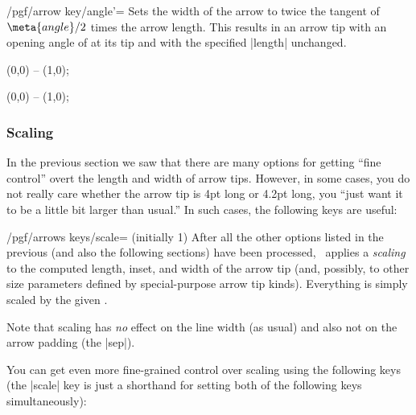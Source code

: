 \begin{key}{/pgf/arrow key/angle'=}
  Sets the width of the arrow to twice the tangent of $\meta{angle}/2$
  times the arrow length. This results in an arrow tip with an opening
  angle of  at its tip and with the specified |length|
  unchanged. 
\begin{codeexample}[]
\tikz \draw [arrows = {-Stealth[inset=0pt, length=10pt, angle'=90]}]
            (0,0) -- (1,0);
\end{codeexample}
\begin{codeexample}[]
\tikz \draw [arrows = {-Stealth[inset=0pt, length=10pt, angle'=30]}]
            (0,0) -- (1,0);
\end{codeexample}
\end{key}


\subsubsection{Scaling}

In the previous section we saw that there are many options for getting
``fine control'' overt the length and width of arrow tips. However, in
some cases, you do not really care whether the arrow tip is 4pt long
or 4.2pt long, you ``just want it to be a little bit larger than
usual.'' In such cases, the following keys are useful:

\begin{key}{/pgf/arrows keys/scale= (initially 1)}
  After all the other options listed in the previous (and also the
  following sections) have been processed, \tikzname\ applies a
  \emph{scaling} to the computed length, inset, and width of the arrow
  tip (and, possibly, to other size parameters defined by
  special-purpose arrow tip kinds). Everything is simply scaled by the
  given .
\begin{codeexample}[]
\end{codeexample}  
  Note that scaling has \emph{no} effect on the line width (as usual)
  and also not on the arrow padding (the |sep|).
\end{key}

You can get even more fine-grained control over scaling using the
following keys (the |scale| key is just a shorthand for setting both
of the following keys simultaneously):

